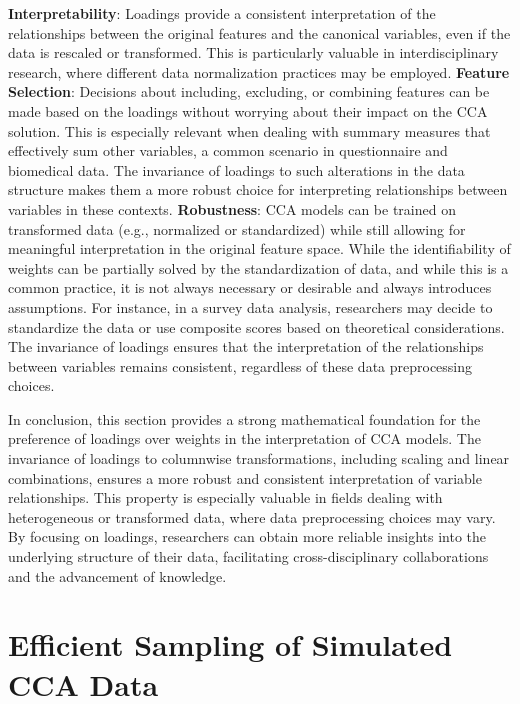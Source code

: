 \textbf{Interpretability}: Loadings provide a consistent interpretation of the relationships between the original features and the canonical variables, even if the data is rescaled or transformed. This is particularly valuable in interdisciplinary research, where different data normalization practices may be employed.
\textbf{Feature Selection}: Decisions about including, excluding, or combining features can be made based on the loadings without worrying about their impact on the CCA solution. This is especially relevant when dealing with summary measures that effectively sum other variables, a common scenario in questionnaire and biomedical data. The invariance of loadings to such alterations in the data structure makes them a more robust choice for interpreting relationships between variables in these contexts.
\textbf{Robustness}: CCA models can be trained on transformed data (e.g., normalized or standardized) while still allowing for meaningful interpretation in the original feature space. While the identifiability of weights can be partially solved by the standardization of data, and while this is a common practice, it is not always necessary or desirable and always introduces assumptions.
For instance, in a survey data analysis, researchers may decide to standardize the data or use composite scores based on theoretical considerations. The invariance of loadings ensures that the interpretation of the relationships between variables remains consistent, regardless of these data preprocessing choices.

In conclusion, this section provides a strong mathematical foundation for the preference of loadings over weights in the interpretation of CCA models. The invariance of loadings to columnwise transformations, including scaling and linear combinations, ensures a more robust and consistent interpretation of variable relationships. This property is especially valuable in fields dealing with heterogeneous or transformed data, where data preprocessing choices may vary. By focusing on loadings, researchers can obtain more reliable insights into the underlying structure of their data, facilitating cross-disciplinary collaborations and the advancement of knowledge.

\section{Efficient Sampling of Simulated CCA Data}\label{sec:efficient}


